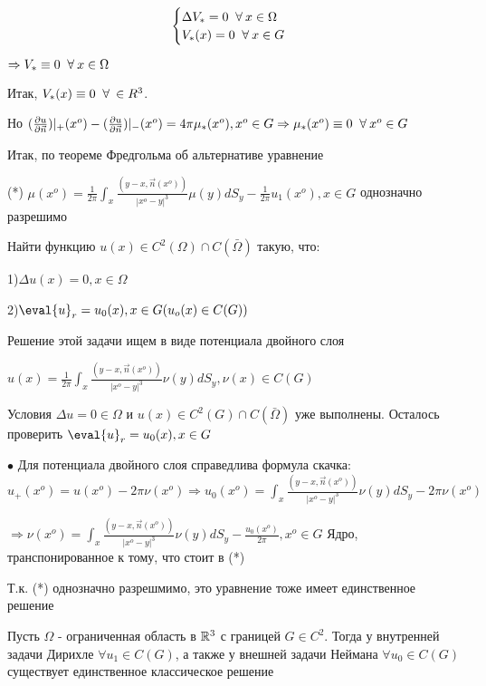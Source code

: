 \begin{equation}
 \begin{cases}
 \Delta V_* = 0 \;\;\forall\: x \in \Omega
  \\
  V_*(x) = 0 \;\;\forall\: x \in G
 \end{cases}
\end{equation}

$\Rightarrow V_* \equiv 0 \;\;\forall\: x \in \Omega$

Итак, $V_*(x) \equiv 0 \;\;\forall\: \in R^3$. 

Но $(\frac{\partial u}{\partial \vec{n}})|_+(x^o) - (\frac{\partial u}{\partial \vec{n}})|_-(x^o) = 4\pi \mu_*(x^o), x^o \in G \Rightarrow \mu_*(x^o) \equiv 0 \;\;\forall\: x^o \in G$

Итак, по теореме Фредгольма об альтернативе уравнение 

(*) $\mu(x^o) = \frac{1}{2\pi}\int_x \frac{(y - x, \vec{n}(x^o))}{|x^o - y|^3}\mu(y)dS_y - \frac{1}{2\pi}u_1(x^o), x \in G$ однозначно разрешимо


Найти функцию $u(x) \in C^2(\Omega) \cap C(\bar{\Omega})$ такую, что:

1)$\Delta u(x) = 0, x \in \Omega$

2)$\eval{u}_r = u_0(x), x \in G (u_o(x) \in C(G))$ 

Решение этой задачи ищем в виде потенциала двойного слоя 

$u(x) = \frac{1}{2\pi}\int_x \frac{(y - x, \vec{n}(x^o))}{|x^o - y|^3}\nu(y)dS_y, \nu(x) \in C(G)$

Условия $\Delta u = 0 \in \Omega$ и $u(x) \in C^2(G) \cap C(\bar{\Omega})$ уже выполнены. Осталось проверить $\eval{u}_r = u_0(x), x \in G$

$\bullet$ Для потенциала двойного слоя справедлива формула скачка: $u_+(x^o) = u(x^o) - 2\pi\nu(x^o) \Rightarrow u_0(x^o) = \int_x \frac{(y - x, \vec{n}(x^o))}{|x^o - y|^3}\nu(y)dS_y - 2\pi\nu(x^o)$

$\Rightarrow \nu(x^o) = \int_x \frac{(y - x, \vec{n}(x^o))}{|x^o - y|^3}\nu(y)dS_y - \frac{u_0(x^o)}{2\pi}, x^o \in G$ Ядро, транспонированное к тому, что стоит в (*) 

Т.к. (*) однозначно разрешмимо, это уравнение тоже имеет единственное решение

\begin{theorem} Пусть $\Omega$ - ограниченная область в $\mathbb{R}^3$ с границей $G \in C^2$. Тогда у внутренней задачи Дирихле $\forall u_1 \in C(G)$, а также у внешней задачи Неймана $\forall u_0 \in C(G)$ существует единственное классическое решение
\end{theorem} 



